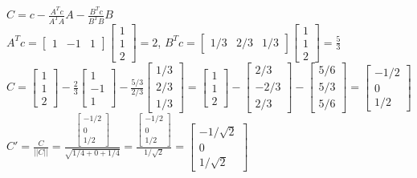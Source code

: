 \documentclass{article}
\begin{document}
\noindent
$C = c - \frac{A^Tc}{A^TA}A - \frac{B^Tc}{B^TB}B$ \\
$A^Tc = \begin{bmatrix}1 & -1 & 1\end{bmatrix}\begin{bmatrix}1 \\ 1 \\ 2\end{bmatrix} = 2$, \quad $B^Tc = \begin{bmatrix}1/3 & 2/3 & 1/3\end{bmatrix}\begin{bmatrix}1 \\ 1 \\ 2\end{bmatrix} = \frac{5}{3}$ \\
$C = \begin{bmatrix}1 \\ 1 \\ 2\end{bmatrix} - \frac{2}{3}\begin{bmatrix}1 \\ -1 \\ 1\end{bmatrix} - \frac{5/3}{2/3}\begin{bmatrix}1/3 \\ 2/3 \\ 1/3\end{bmatrix} = \begin{bmatrix}1 \\ 1 \\ 2\end{bmatrix} - \begin{bmatrix}2/3 \\ -2/3 \\ 2/3\end{bmatrix} - \begin{bmatrix}5/6 \\ 5/3 \\ 5/6\end{bmatrix} = \begin{bmatrix}-1/2 \\ 0 \\ 1/2\end{bmatrix}$ \\
$C' = \frac{C}{||C||} = \frac{\begin{bmatrix}-1/2 \\ 0 \\ 1/2\end{bmatrix}}{\sqrt{1/4 + 0 + 1/4}} = \frac{\begin{bmatrix}-1/2 \\ 0 \\ 1/2\end{bmatrix}}{1/\sqrt{2}} = \begin{bmatrix}-1/\sqrt{2} \\ 0 \\ 1/\sqrt{2}\end{bmatrix}$
\end{document}
